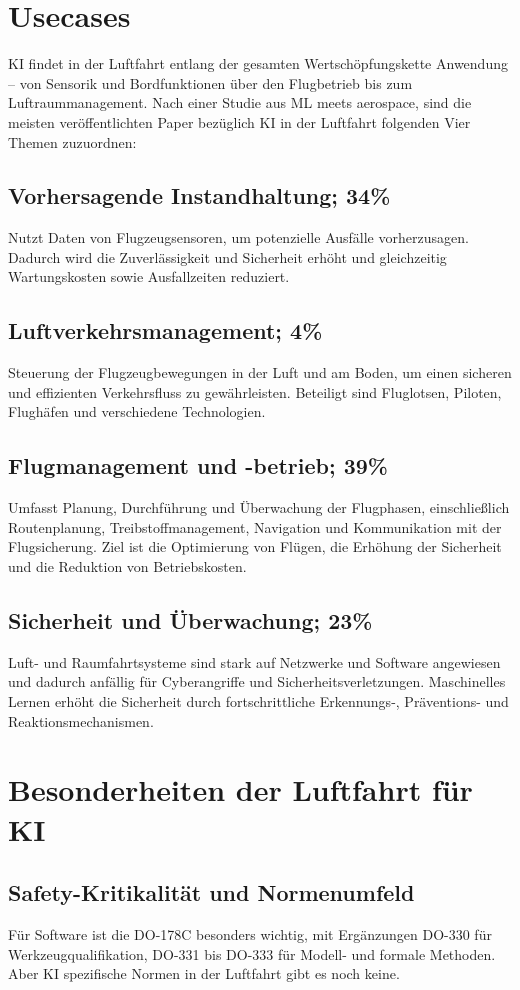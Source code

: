 \section{Usecases}
KI findet in der Luftfahrt entlang der gesamten Wertschöpfungskette Anwendung – von Sensorik und Bordfunktionen 
über den Flugbetrieb bis zum Luftraummanagement. Nach einer Studie aus ML meets aerospace, sind die meisten 
veröffentlichten Paper bezüglich KI in der Luftfahrt folgenden Vier Themen zuzuordnen:

\subsection{Vorhersagende Instandhaltung; 34\%}
Nutzt Daten von Flugzeugsensoren, um potenzielle Ausfälle vorherzusagen. 
Dadurch wird die Zuverlässigkeit und Sicherheit erhöht und gleichzeitig Wartungskosten sowie Ausfallzeiten reduziert.
\subsection{Luftverkehrsmanagement; 4\%}
Steuerung der Flugzeugbewegungen in der Luft und am Boden, um einen sicheren und effizienten Verkehrsfluss zu gewährleisten. 
Beteiligt sind Fluglotsen, Piloten, Flughäfen und verschiedene Technologien.
\subsection{Flugmanagement und -betrieb; 39\%}
Umfasst Planung, Durchführung und Überwachung der Flugphasen, einschließlich Routenplanung, Treibstoffmanagement, 
Navigation und Kommunikation mit der Flugsicherung. Ziel ist die Optimierung von Flügen, die Erhöhung der Sicherheit 
und die Reduktion von Betriebskosten.
\subsection{Sicherheit und Überwachung; 23\%}
Luft- und Raumfahrtsysteme sind stark auf Netzwerke und Software angewiesen und dadurch anfällig für Cyberangriffe und Sicherheitsverletzungen. 
Maschinelles Lernen erhöht die Sicherheit durch fortschrittliche Erkennungs-, Präventions- und Reaktionsmechanismen.

\section{Besonderheiten der Luftfahrt für KI}
\subsection{Safety-Kritikalität und Normenumfeld}
Für Software ist die DO-178C besonders wichtig, mit Ergänzungen DO-330 für Werkzeugqualifikation, 
DO-331 bis DO-333 für Modell- und formale Methoden.
Aber KI spezifische Normen in der Luftfahrt gibt es noch keine.
